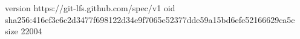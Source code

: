 version https://git-lfs.github.com/spec/v1
oid sha256:416ef3c6c2d3477f698122d34e9f7065e52377dde59a15bd6efe52166629ca5c
size 22004
